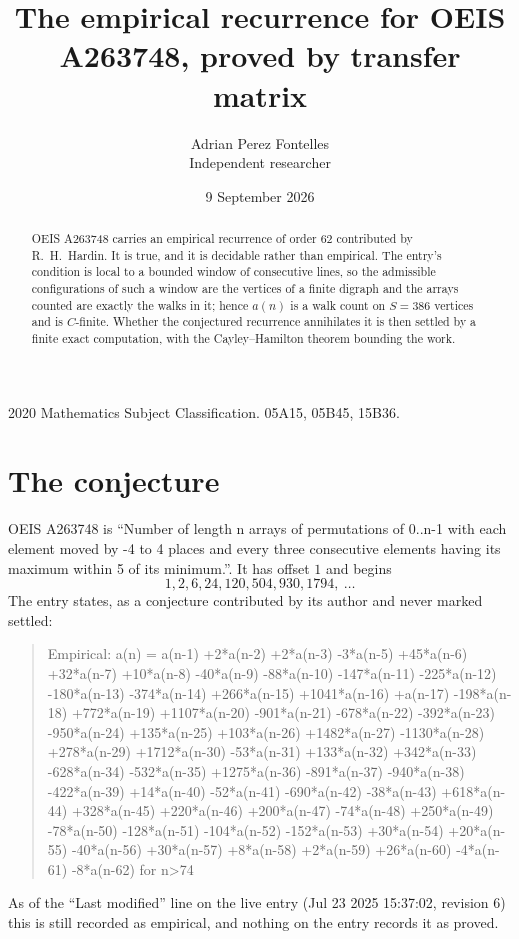 \documentclass[11pt,a4paper]{article}
\title{The empirical recurrence for OEIS A263748, proved by transfer matrix}
\author{Adrian Perez Fontelles\\ \small Independent researcher}
\date{9 September 2026}
\theoremstyle{plain}
\theoremstyle{definition}
\begin{document}
\maketitle

\begin{abstract}
OEIS A263748 carries an empirical recurrence of order $62$ contributed by R.~H.~Hardin. It is
true, and it is decidable rather than empirical. The entry's condition is local to a bounded window of consecutive lines, so
the admissible configurations of such a window are the vertices of a finite digraph and the
arrays counted are exactly the walks in it; hence $a(n)$ is a walk count on $S=386$ vertices
and is $C$-finite. Whether the conjectured recurrence annihilates it is then settled by a
finite exact computation, with the Cayley--Hamilton theorem bounding the work.
\end{abstract}

\noindent\small 2020 Mathematics Subject Classification. 05A15, 05B45, 15B36.\normalsize

\section{The conjecture}

OEIS A263748 is ``Number of length n arrays of permutations of 0..n-1 with each element moved by -4 to 4 places and every three consecutive elements having its maximum within 5 of its minimum.''. It has offset $1$ and begins
\[
1, 2, 6, 24, 120, 504, 930, 1794,\ \dots
\]
The entry states, as a conjecture contributed by its author and never marked settled:
\begin{quote}
Empirical: a(n) = a(n-1) +2*a(n-2) +2*a(n-3) -3*a(n-5) +45*a(n-6) +32*a(n-7) +10*a(n-8) -40*a(n-9) -88*a(n-10) -147*a(n-11) -225*a(n-12) -180*a(n-13) -374*a(n-14) +266*a(n-15) +1041*a(n-16) +a(n-17) -198*a(n-18) +772*a(n-19) +1107*a(n-20) -901*a(n-21) -678*a(n-22) -392*a(n-23) -950*a(n-24) +135*a(n-25) +103*a(n-26) +1482*a(n-27) -1130*a(n-28) +278*a(n-29) +1712*a(n-30) -53*a(n-31) +133*a(n-32) +342*a(n-33) -628*a(n-34) -532*a(n-35) +1275*a(n-36) -891*a(n-37) -940*a(n-38) -422*a(n-39) +14*a(n-40) -52*a(n-41) -690*a(n-42) -38*a(n-43) +618*a(n-44) +328*a(n-45) +220*a(n-46) +200*a(n-47) -74*a(n-48) +250*a(n-49) -78*a(n-50) -128*a(n-51) -104*a(n-52) -152*a(n-53) +30*a(n-54) +20*a(n-55) -40*a(n-56) +30*a(n-57) +8*a(n-58) +2*a(n-59) +26*a(n-60) -4*a(n-61) -8*a(n-62) for n>74
\end{quote}
As of the ``Last modified'' line on the live entry (Jul 23 2025 15:37:02, revision 6) this is still
recorded as empirical, and nothing on the entry records it as proved.
\end{document}
